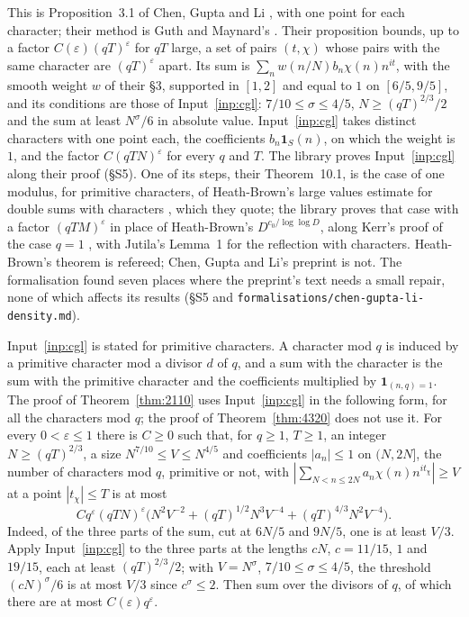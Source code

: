 \documentclass[11pt]{article}
\theoremstyle{definition}
\newcommand{\file}[1]{\nolinkurl{#1}}
\begin{document}
This is Proposition~3.1 of Chen, Gupta and Li \cite{cgl}, with one point for each character; their method is Guth and
Maynard's \cite{guth-maynard}. Their proposition bounds, up to a factor $C(\varepsilon)(qT)^\varepsilon$ for $qT$
large, a set of pairs $(t, \chi)$ whose pairs with the same character are $(qT)^\varepsilon$ apart. Its sum is $\sum_n
w(n/N) b_n \chi(n) n^{it}$, with the smooth weight $w$ of their \S 3, supported in $[1, 2]$ and equal to $1$ on $[6/5,
9/5]$, and its conditions are those of Input~\ref{inp:cgl}: $7/10 \le \sigma \le 4/5$, $N \ge (qT)^{2/3}/2$ and the
sum at least $N^\sigma/6$ in absolute value. Input~\ref{inp:cgl} takes distinct characters with one point each, the
coefficients $b_n \mathbf 1_S(n)$, on which the weight is $1$, and the factor $C(qTN)^\varepsilon$ for every $q$ and
$T$. The library proves Input~\ref{inp:cgl} along their proof (\S S5). One of its steps, their Theorem~10.1, is the
case of one modulus, for primitive characters, of Heath-Brown's large values estimate for double sums with characters
\cite[Theorem~1]{hb79b}, which they quote; the library proves that case with a factor $(qTM)^\varepsilon$ in place of
Heath-Brown's $D^{c_0/\log\log D}$, along Kerr's proof of the case $q = 1$ \cite{kerr}, with Jutila's Lemma~1
\cite{jutila} for the reflection with characters. Heath-Brown's theorem is refereed; Chen, Gupta and Li's preprint is
not. The formalisation found seven places where the preprint's text needs a small repair, none of which affects its
results (\S S5 and \file{formalisations/chen-gupta-li-density.md}).

Input~\ref{inp:cgl} is stated for primitive characters. A character mod $q$ is induced by a primitive character mod a
divisor $d$ of $q$, and a sum with the character is the sum with the primitive character and the coefficients
multiplied by $\mathbf 1_{(n, q) = 1}$.
The proof of Theorem~\ref{thm:2110} uses Input~\ref{inp:cgl} in the following form, for all the characters mod $q$;
the proof of Theorem~\ref{thm:4320} does not use it. For every $0 < \varepsilon \le 1$ there is $C \ge 0$ such that,
for $q \ge 1$, $T \ge 1$, an integer $N \ge (qT)^{2/3}$, a size $N^{7/10} \le V \le N^{4/5}$ and coefficients
$|a_n| \le 1$ on $(N, 2N]$, the number of characters mod $q$, primitive or not, with
$|\sum_{N < n \le 2N} a_n \chi(n) n^{it_\chi}| \ge V$ at a point $|t_\chi| \le T$ is at most
\[
  C q^\varepsilon (qTN)^\varepsilon \bigl(N^2 V^{-2} + (qT)^{1/2} N^3 V^{-4} + (qT)^{4/3} N^2 V^{-4}\bigr). \tag{CGL}
\]
Indeed, of the three parts of the sum, cut at $6N/5$ and $9N/5$, one is at least $V/3$. Apply Input~\ref{inp:cgl} to
the three parts at the lengths $cN$, $c = 11/15$, $1$ and $19/15$, each at least $(qT)^{2/3}/2$; with $V = N^\sigma$,
$7/10 \le \sigma \le 4/5$, the threshold $(cN)^\sigma/6$ is at most $V/3$ since $c^\sigma \le 2$. Then sum over the
divisors of $q$, of which there are at most $C(\varepsilon) q^\varepsilon$.
\end{document}
